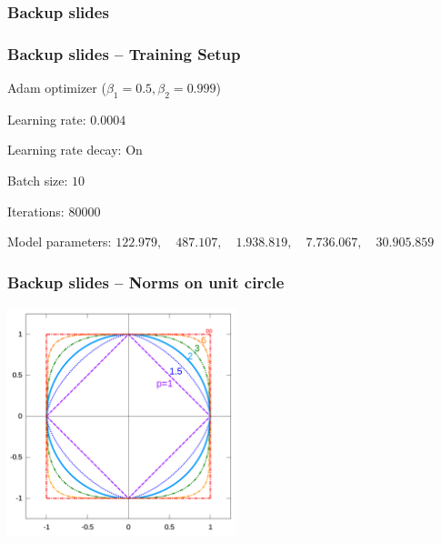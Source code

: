 \begin{frame}
    \frametitle{Backup slides}

\end{frame}
\clearpage

\begin{frame}
    \frametitle{Backup slides -- Training Setup}
    \vspace*{0.8cm}

Adam optimizer ($\beta_1 = 0.5, \beta_2 = 0.999$)

Learning rate: $0.0004$

Learning rate decay: On

Batch size: $10$

Iterations: $80000$

Model parameters: \newline $122.979, \quad 487.107, \quad 1.938.819, \quad 7.736.067, \quad  30.905.859$

\end{frame}
\clearpage

\begin{frame}
    \frametitle{Backup slides -- Norms on unit circle}
\vspace*{1.25cm}
\includegraphics[width=0.5\textwidth, height=0.5\textheight]{./Ressourcen/Praesentation/Bilder/norms.png}%


\end{frame}
\clearpage